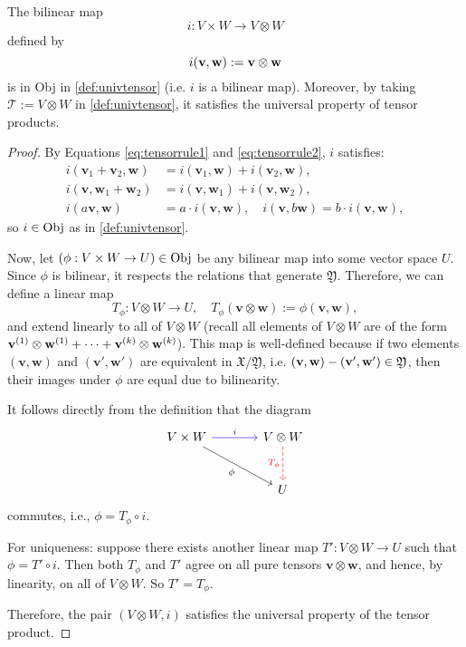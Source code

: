 \begin{theorem}\label{thm: univ-binlinear-map} 
The bilinear map
$$i : V \times W \rightarrow V \otimes W$$ 
defined by 
$$i({\bf v}, {\bf w}) := {\bf v} \otimes {\bf w}$$ 
is in \textnormal{Obj} in \autoref{def:univtensor} (i.e. $i$ is a bilinear map). Moreover, by taking $\mathcal{T} := V \otimes W$ in \autoref{def:univtensor}, it satisfies the universal property of tensor products.
\end{theorem}
\begin{proof}
By Equations \eqref{eq:tensorrule1} and \eqref{eq:tensorrule2}, \( i \) satisfies:
\begin{align*}
    i(\mathbf{v}_1 + \mathbf{v}_2, \mathbf{w}) &= i(\mathbf{v}_1, \mathbf{w}) + i(\mathbf{v}_2, \mathbf{w}), \\
    i(\mathbf{v}, \mathbf{w}_1 + \mathbf{w}_2) &= i(\mathbf{v}, \mathbf{w}_1) + i(\mathbf{v}, \mathbf{w}_2), \\
    i(a \mathbf{v}, \mathbf{w}) &= a \cdot i(\mathbf{v}, \mathbf{w}), \quad i(\mathbf{v}, b \mathbf{w}) = b \cdot i(\mathbf{v}, \mathbf{w}),
\end{align*}
so \( i \in \textnormal{Obj} \) as in \autoref{def:univtensor}.

Now, let \( (\phi : V \times W \to U) \in \textnormal{Obj} \) be any bilinear map into some vector space \( U \). Since \( \phi \) is bilinear, it respects the relations that generate \( \mathfrak{Y} \). Therefore, we can define a linear map
\[
T_{\phi} : V \otimes W \to U, \quad T_{\phi}(\mathbf{v} \otimes \mathbf{w}) := \phi(\mathbf{v}, \mathbf{w}),
\]
and extend linearly to all of \( V \otimes W \) (recall all elements of $V \otimes W$ are of the form ${\bf v}^{(1)} \otimes {\bf w}^{(1)} + \dots + {\bf v}^{(k)} \otimes {\bf w}^{(k)}$). This map is well-defined because if two elements \( (\mathbf{v}, \mathbf{w}) \) and \( (\mathbf{v}', \mathbf{w}') \) are equivalent in \( \mathfrak{X}/\mathfrak{Y} \), i.e. $({\bf v},{\bf w}) - ({\bf v}',{\bf w}') \in \mathfrak{Y}$, then their images under \( \phi \) are equal due to bilinearity.

It follows directly from the definition that the diagram
\[
\begin{tikzcd}[row sep=large, column sep=large]
V \times W \arrow[r, "i", blue] \arrow[rd, "\phi"'] & V \otimes W \arrow[d, "T_{\phi}"', dashed, red] \\
& U
\end{tikzcd}
\]
commutes, i.e., \( \phi = T_\phi \circ i \).

For uniqueness: suppose there exists another linear map \( T' : V \otimes W \to U \) such that \( \phi = T' \circ i \). Then both \( T_\phi \) and \( T' \) agree on all pure tensors \( \mathbf{v} \otimes \mathbf{w} \), and hence, by linearity, on all of \( V \otimes W \). So \( T' = T_\phi \).

Therefore, the pair \( (V \otimes W, i) \) satisfies the universal property of the tensor product.
\end{proof}
